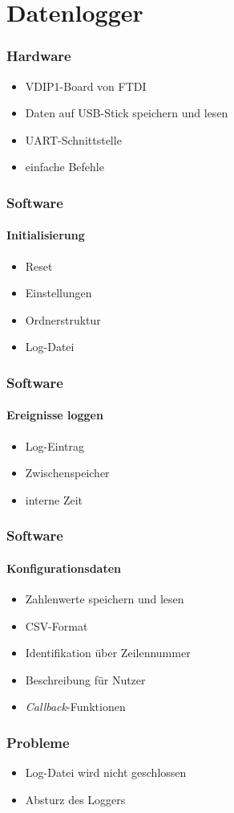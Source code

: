 \section{Datenlogger}

\begin{frame}
	\frametitle{Hardware}
	\begin{itemize}
		\item VDIP1-Board von FTDI
		\item Daten auf USB-Stick speichern und lesen
		\item UART-Schnittstelle
		\item einfache Befehle
	\end{itemize}
\end{frame}

\begin{frame}
	\frametitle{Software}
	\framesubtitle{Initialisierung}
	\begin{itemize}
		\item Reset
		\item Einstellungen
		\item Ordnerstruktur
		\item Log-Datei
	\end{itemize}
\end{frame}

\begin{frame}
	\frametitle{Software}
	\framesubtitle{Ereignisse loggen}
	\begin{itemize}
		\item Log-Eintrag
		\item Zwischenspeicher
		\item interne Zeit
	\end{itemize}
\end{frame}

\begin{frame}
	\frametitle{Software}
	\framesubtitle{Konfigurationsdaten}
	\begin{itemize}
		\item Zahlenwerte speichern und lesen
		\item CSV-Format
		\item Identifikation über Zeilennummer
		\item Beschreibung für Nutzer
		\item \textit{Callback}-Funktionen
	\end{itemize}
\end{frame}

\begin{frame}
	\frametitle{Probleme}
	\begin{itemize}
		\item Log-Datei wird nicht geschlossen
		\item Absturz des Loggers
	\end{itemize}
	
\end{frame}